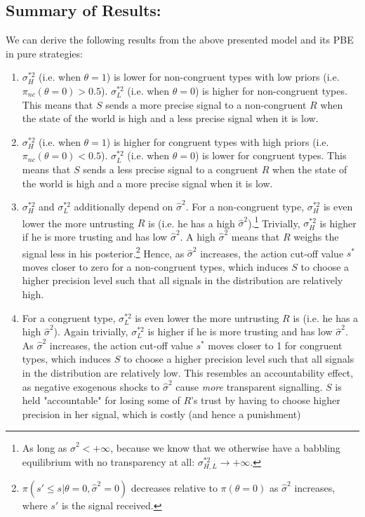 \documentclass[paper=a4,12pt,DIV=11,twoside=false]{scrartcl}
\begin{document}
\subsection{Summary of Results:}

\noindent We can derive the following results from the above presented model and its PBE in pure strategies:

\begin{enumerate}
\item $\sigma^{*2}_H$ (i.e. when $\theta = 1$) is lower for non-congruent types with low priors (i.e. $\pi_{nc}(\theta = 0)>0.5$). $\sigma^{*2}_L$ (i.e. when $\theta = 0$) is higher for non-congruent types. This means that $S$ sends a more precise signal to a non-congruent $R$ when the state of the world is high and a less precise signal when it is low.
\item $\sigma^{*2}_H$ (i.e. when $\theta = 1$) is higher for congruent types with high priors (i.e. $\pi_{nc}(\theta = 0)<0.5$). $\sigma^{*2}_L$ (i.e. when $\theta = 0$) is lower for congruent types. This means that $S$ sends a less precise signal to a congruent $R$ when the state of the world is high and a more precise signal when it is low.
\item $\sigma^{*2}_H$ and $\sigma^{*2}_L$ additionally depend on $\hat{\sigma}^2$. For a non-congruent type, $\sigma^{*2}_H$ is even lower the more untrusting $R$ is (i.e. he has a high $\hat{\sigma}^2$).\footnote{As long as $\hat{\sigma}^2 < +\infty$, because we know that we otherwise have a babbling equilibrium with no transparency at all: $\sigma^{*2}_{H,L} \to +\infty$.} Trivially, $\sigma^{*2}_H$ is higher if he is more trusting and has low $\hat{\sigma}^2$. A high $\hat{\sigma}^2$ means that $R$ weighs the signal less in his posterior.\footnote{$\pi(s' \leq s | \theta = 0,\hat{\sigma}^2=0)$ decreases relative to $\pi(\theta = 0)$ as $\hat{\sigma}^2$ increases, where $s'$ is the signal received.} Hence, as $\hat{\sigma}^2$ increases, the action cut-off value $s^{*}$ moves closer to zero for a non-congruent types, which induces $S$ to choose a higher precision level such that all signals in the distribution are relatively high.
\item For a congruent type, $\sigma^{*2}_L$ is even lower the more untrusting $R$ is (i.e. he has a high $\hat{\sigma}^2$). Again trivially, $\sigma^{*2}_L$ is higher if he is more trusting and has low $\hat{\sigma}^2$. As $\hat{\sigma}^2$ increases, the action cut-off value $s^{*}$ moves closer to 1 for congruent types, which induces $S$ to choose a higher precision level such that all signals in the distribution are relatively low. This resembles an accountability effect, as negative exogenous shocks to $\hat{\sigma}^2$ cause \textit{more} transparent signalling. $S$ is held "accountable" for losing some of $R$'s trust by having to choose higher precision in her signal, which is costly (and hence a punishment)

\end{enumerate}
\end{document}
